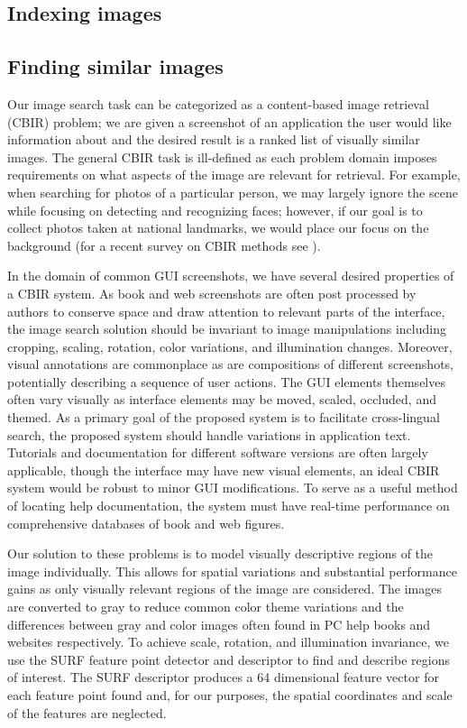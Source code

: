 \documentclass{www2010-submission}
\begin{document}
\subsection{Indexing images}

\subsection{Finding similar images}
Our image search task can be categorized as a content-based image
retrieval (CBIR) problem; we are given a screenshot of an application
the user would like information about and the desired result is a
ranked list of visually similar images.  The general CBIR task is
ill-defined as each problem domain imposes requirements on what
aspects of the image are relevant for retrieval.  For example, when
searching for photos of a particular person, we may largely ignore the
scene while focusing on detecting and recognizing faces; however, if
our goal is to collect photos taken at national landmarks, we
would place our focus on the background (for a recent survey on CBIR
methods see \cite{Datta1348248}).

In the domain of common GUI screenshots, we have several desired
properties of a CBIR system.  As book and web screenshots are often
post processed by authors to conserve space and draw attention to
relevant parts of the interface, the image search solution should be
invariant to image manipulations including cropping, scaling,
rotation, color variations, and illumination changes.  Moreover,
visual annotations are commonplace as are compositions of different
screenshots, potentially describing a sequence of user actions.  The
GUI elements themselves often vary visually as interface elements may
be moved, scaled, occluded, and themed.  As a primary goal of the
proposed system is to facilitate cross-lingual search, the proposed
system should handle variations in application text.  Tutorials and
documentation for different software versions are often largely
applicable, though the interface may have new visual elements, an
ideal CBIR system would be robust to minor GUI modifications.  To
serve as a useful method of locating help documentation, the system
must have real-time performance on comprehensive databases of book and
web figures.

Our solution to these problems is to model visually descriptive
regions of the image individually.  This allows for spatial variations
and substantial performance gains as only visually relevant regions
of the image are considered.  The images are converted to gray to
reduce common color theme variations and the differences between gray
and color images often found in PC help books and websites
respectively.  To achieve scale, rotation, and illumination
invariance, we use the SURF feature point detector and descriptor
\cite{VanGool1370556} to find and describe regions of interest.  The
SURF descriptor produces a 64 dimensional feature vector for each
feature point found and, for our purposes, the spatial coordinates and
scale of the features are neglected.
\end{document}
